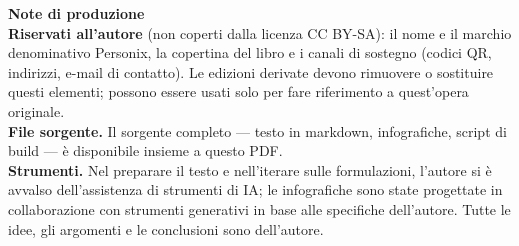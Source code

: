 \clearpage
\thispagestyle{empty}
\begin{flushleft}\small\sffamily
\textbf{Note di produzione}\\[1.2em]

\textbf{Riservati all'autore} (non coperti dalla licenza CC BY-SA): il nome e
il marchio denominativo Personix, la copertina del libro e i canali di
sostegno (codici QR, indirizzi, e-mail di contatto). Le edizioni derivate
devono rimuovere o sostituire questi elementi; possono essere usati solo per
fare riferimento a quest'opera originale.\\[1.2em]

\textbf{File sorgente.} Il sorgente completo --- testo in markdown,
infografiche, script di build --- è disponibile insieme a questo PDF.\\[1.2em]

\textbf{Strumenti.} Nel preparare il testo e nell'iterare sulle formulazioni,
l'autore si è avvalso dell'assistenza di strumenti di IA; le infografiche sono
state progettate in collaborazione con strumenti generativi in base alle
specifiche dell'autore. Tutte le idee, gli argomenti e le conclusioni sono
dell'autore.
\end{flushleft}
\clearpage
